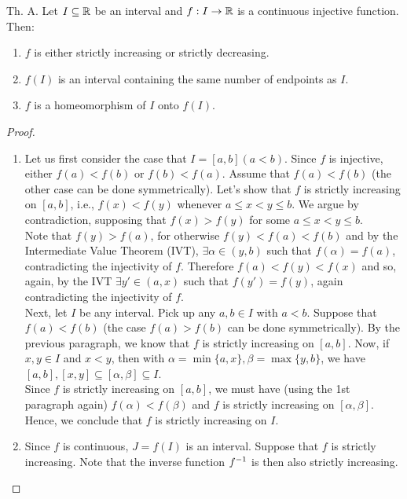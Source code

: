 \begin{theorem}
    Th. A. Let $I \subseteq \mathbb{R}$ be an interval and $f: I \to \mathbb{R}$ is a continuous injective function. Then:
    \begin{enumerate}
        \item $f$ is either strictly increasing or strictly decreasing.
        \item $f(I)$ is an interval containing the same number of endpoints as $I$.
        \item $f$ is a homeomorphism of $I$ onto $f(I)$.
    \end{enumerate}
\end{theorem}
\begin{proof}
    \begin{enumerate}
        \item Let us first consider the case that $I = [a, b] (a < b)$. Since $f$ is injective, either $f(a) < f(b)$ or $f(b) < f(a)$. Assume that $f(a) < f(b)$ (the other case can be done symmetrically). Let's show that $f$ is strictly increasing on $[a,b]$, i.e., $f(x) < f(y)$ whenever $a \leq x < y \leq b$. We argue by contradiction, supposing that $f(x) > f(y)$ for some $a \leq x < y \leq b$. \\ 
        Note that $f(y) > f(a)$, for otherwise $f(y) < f(a) < f(b)$ and by the Intermediate Value Theorem (IVT), $\exists \alpha \in (y,b)$ such that $f(\alpha) = f(a)$, contradicting the injectivity of $f$. Therefore $f(a) < f(y) < f(x)$ and so, again, by the IVT $\exists y' \in (a,x)$ such that $f(y') = f(y)$, again contradicting the injectivity of $f$. \\
        Next, let $I$ be any interval. Pick up any $a, b \in I$ with $a < b$. Suppose that $f(a) < f(b)$ (the case $f(a) > f(b)$ can be done symmetrically). By the previous paragraph, we know that $f$ is strictly increasing on $[a,b]$. Now, if $x, y \in I$ and $x < y$, then with $\alpha = \min \{a, x\}, \beta = \max \{y, b\}$, we have $[a,b], [x, y] \subseteq [\alpha, \beta] \subseteq I$. \\
        Since $f$ is strictly increasing on $[a,b]$, we must have (using the 1st paragraph again) $f(\alpha) < f(\beta)$ and $f$ is strictly increasing on $[\alpha, \beta]$. Hence, we conclude that $f$ is strictly increasing on $I$.
        \item Since $f$ is continuous, $J = f(I)$ is an interval. Suppose that $f$ is strictly increasing. Note that the inverse function $f ^{-1}$ is then also strictly increasing. \\

\end{enumerate}
\end{proof}

